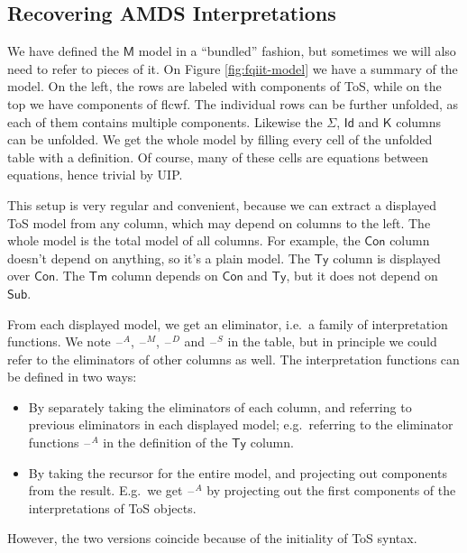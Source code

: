 \documentclass[12pt,a4paper,twoside,openany]{book}
\theoremstyle{remark}
\theoremstyle{definition}
\theoremstyle{theorem}
\newcommand{\bs}[1]{\boldsymbol{#1}}
\newcommand{\Con}{\mathsf{Con}}
\newcommand{\Sub}{\mathsf{Sub}}
\newcommand{\Tm}{\mathsf{Tm}}
\newcommand{\Ty}{\mathsf{Ty}}
\newcommand{\Id}{\mathsf{Id}}
\newcommand{\blank}{\mathord{\hspace{1pt}\text{--}\hspace{1pt}}}
\newcommand{\K}{\mathsf{K}}
\newcommand{\bM}{\bs{\mathsf{M}}}
\begin{document}
\subsection{Recovering AMDS Interpretations}

We have defined the $\bM$ model in a ``bundled'' fashion, but sometimes we will
also need to refer to pieces of it. On Figure \ref{fig:fqiit-model} we have a
summary of the model. On the left, the rows are labeled with components of ToS,
while on the top we have components of flcwf. The individual rows can be further
unfolded, as each of them contains multiple components. Likewise the $\Sigma$,
$\Id$ and $\K$ columns can be unfolded. We get the whole model by filling every
cell of the unfolded table with a definition. Of course, many of these cells are
equations between equations, hence trivial by UIP.

This setup is very regular and convenient, because we can extract a displayed
ToS model from any column, which may depend on columns to the left. The whole
model is the total model of all columns. For example, the $\Con$ column doesn't
depend on anything, so it's a plain model. The $\Ty$ column is displayed over
$\Con$. The $\Tm$ column depends on $\Con$ and $\Ty$, but it does not depend on $\Sub$.

From each displayed model, we get an eliminator, i.e.\ a family of
interpretation functions. We note $\blank^A$, $\blank^M$, $\blank^D$ and
$\blank^S$ in the table, but in principle we could refer to the eliminators of
other columns as well. The interpretation functions can be defined in two ways:
\begin{itemize}
\item By separately taking the eliminators of each column, and referring to previous
      eliminators in each displayed model; e.g.\ referring to the eliminator functions $\blank^A$ in
      the definition of the $\Ty$ column.
\item By taking the recursor for the entire model, and projecting out components from the result. E.g.\
      we get $\blank^A$ by projecting out the first components of the interpretations of ToS objects.
\end{itemize}
However, the two versions coincide because of the initiality of ToS syntax.
\end{document}
